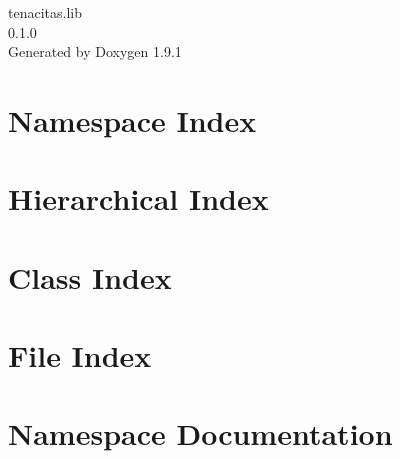 \let\mypdfximage\pdfximage\def\pdfximage{\immediate\mypdfximage}\documentclass[twoside]{book}
\newcommand{\+}{\discretionary{\mbox{\scriptsize$\hookleftarrow$}}{}{}}
\newcommand{\clearemptydoublepage}{%
  \newpage{\pagestyle{empty}\cleardoublepage}%
}
\begin{document}
\raggedbottom

\hypersetup{pageanchor=false,
             bookmarksnumbered=true,
             pdfencoding=unicode
            }
\begin{titlepage}
\vspace*{7cm}
\begin{center}%
{\Large tenacitas.\+lib \\[1ex]\large 0.\+1.\+0 }\\
\vspace*{1cm}
{\large Generated by Doxygen 1.9.1}\\
\end{center}
\end{titlepage}
\clearemptydoublepage
{}
\tableofcontents
\clearemptydoublepage
{}
\hypersetup{pageanchor=true}

\chapter{Namespace Index}

\chapter{Hierarchical Index}

\chapter{Class Index}

\chapter{File Index}

\chapter{Namespace Documentation}






















\end{document}
